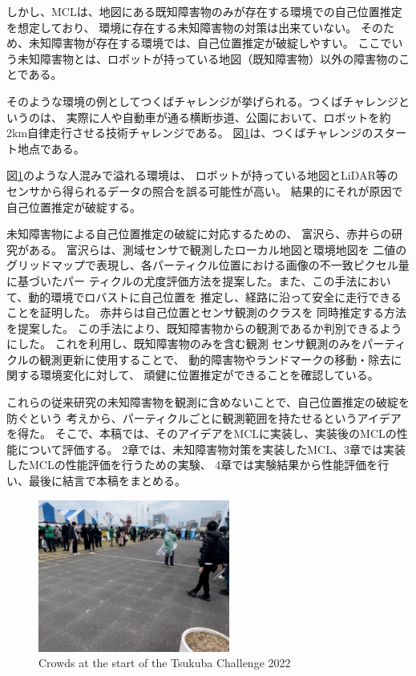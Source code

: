 \documentclass{jarticle}
\begin{document}
しかし、MCLは、地図にある既知障害物のみが存在する環境での自己位置推定を想定しており、
環境に存在する未知障害物の対策は出来ていない。
そのため、未知障害物が存在する環境では、自己位置推定が破綻しやすい。
ここでいう未知障害物とは、ロボットが持っている地図（既知障害物）以外の障害物のことである。

そのような環境の例としてつくばチャレンジ\cite{つくばチャレンジ}が挙げられる。つくばチャレンジというのは、
実際に人や自動車が通る横断歩道、公園において、ロボットを約2km自律走行させる技術チャレンジである。
図\ref{fig: つくばチャレンジ人混み}は、つくばチャレンジのスタート地点である。

図\ref{fig: つくばチャレンジ人混み}のような人混みで溢れる環境は、
ロボットが持っている地図とLiDAR等の
センサから得られるデータの照合を誤る可能性が高い。
結果的にそれが原因で自己位置推定が破綻する。

未知障害物による自己位置推定の破綻に対応するための、
富沢ら\cite{富沢2012}、赤井ら\cite{赤井2019}の研究がある。
富沢ら\cite{富沢2012}は、測域センサで観測したローカル地図と環境地図を
二値のグリッドマップで表現し、各パーティクル位置における画像の不一致ピクセル量に基づいたパー
ティクルの尤度評価方法を提案した。また、この手法において、動的環境でロバストに自己位置を
推定し、経路に沿って安全に走行できることを証明した。
赤井ら\cite{赤井2019}は自己位置とセンサ観測のクラスを
同時推定する方法を提案した。
この手法により、既知障害物からの観測であるか判別できるようにした。
これを利用し、既知障害物のみを含む観測
センサ観測のみをパーティクルの観測更新に使用することで、
動的障害物やランドマークの移動・除去に関する環境変化に対して、
頑健に位置推定ができることを確認している。

これらの従来研究の未知障害物を観測に含めないことで、自己位置推定の破綻を防ぐという
考えから、パーティクルごとに観測範囲を持たせるというアイデアを得た。
そこで、本稿では、そのアイデアをMCLに実装し、実装後のMCLの性能について評価する。
2章では、未知障害物対策を実装したMCL、3章では実装したMCLの性能評価を行うための実験、
4章では実験結果から性能評価を行い、最後に結言で本稿をまとめる。

\begin{figure}[h!]
  \centering
   \includegraphics[height=50mm]{fig/hitogomi.png}
   \vspace*{-4mm}
   \caption{Crowds at the start of the Tsukuba Challenge 2022}
   \label{fig: つくばチャレンジ人混み}
 \end{figure}
\end{document}
